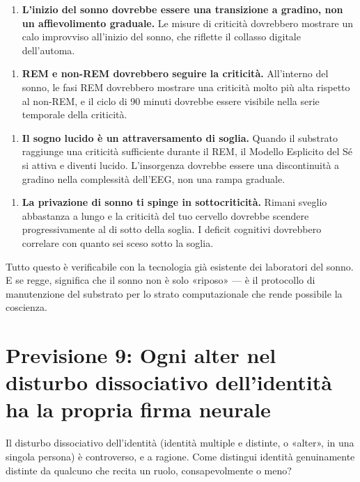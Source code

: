 \documentclass[11pt, twoside, openright]{book}
\begin{document}
\begin{enumerate}
  \item \textbf{L'inizio del sonno dovrebbe essere una transizione a gradino, non un affievolimento graduale.} Le misure di criticità dovrebbero mostrare un calo improvviso all'inizio del sonno, che riflette il collasso digitale dell'automa.
\end{enumerate}

\begin{enumerate}
  \item \textbf{REM e non-REM dovrebbero seguire la criticità.} All'interno del sonno, le fasi REM dovrebbero mostrare una criticità molto più alta rispetto al non-REM, e il ciclo di 90 minuti dovrebbe essere visibile nella serie temporale della criticità.
\end{enumerate}

\begin{enumerate}
  \item \textbf{Il sogno lucido è un attraversamento di soglia.} Quando il substrato raggiunge una criticità sufficiente durante il REM, il Modello Esplicito del Sé si attiva e diventi lucido. L'insorgenza dovrebbe essere una discontinuità a gradino nella complessità dell'EEG, non una rampa graduale.
\end{enumerate}

\begin{enumerate}
  \item \textbf{La privazione di sonno ti spinge in sottocriticità.} Rimani sveglio abbastanza a lungo e la criticità del tuo cervello dovrebbe scendere progressivamente al di sotto della soglia. I deficit cognitivi dovrebbero correlare con quanto sei sceso sotto la soglia.
\end{enumerate}

Tutto questo è verificabile con la tecnologia già esistente dei laboratori del sonno. E se regge, significa che il sonno non è solo «riposo» --- è il protocollo di manutenzione del substrato per lo strato computazionale che rende possibile la coscienza.

\section*{Previsione 9: Ogni alter nel disturbo dissociativo dell'identità ha la propria firma neurale}

Il disturbo dissociativo dell'identità (identità multiple e distinte, o «alter», in una singola persona) è controverso, e a ragione. Come distingui identità genuinamente distinte da qualcuno che recita un ruolo, consapevolmente o meno?
\end{document}
